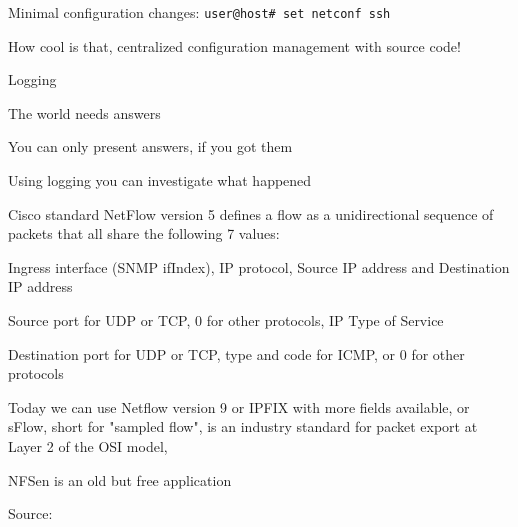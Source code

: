 \documentclass[Screen16to9,17pt]{foils}
\begin{document}
\begin{list2}
\item Minimal configuration changes: \verb+user@host# set netconf ssh+
\end{list2}

How cool is that, centralized configuration management with source code!



\centerline{\LARGE Logging}

\begin{quote}

\end{quote}

\begin{list2}
\item The world needs answers
\item You can only present answers, if you got them

\item Using logging you can investigate what happened
\end{list2}





\begin{slidelist}
\item Cisco standard NetFlow version 5 defines a flow as a unidirectional sequence of packets that all share the following 7 values:
\begin{list2}
\item Ingress interface (SNMP ifIndex), IP protocol, Source IP address and Destination IP address
\item Source port for UDP or TCP, 0 for other protocols, IP Type of Service
\item Destination port for UDP or TCP, type and code for ICMP, or 0 for other protocols
\end{list2}
\item Today we can use Netflow version 9 or IPFIX with more fields available, or  sFlow, short for "sampled flow", is an industry standard for packet export at Layer 2 of the OSI model, \\
\item NFSen is an old but free application
\end{slidelist}

Source: \\{\footnotesize
{}\\
}
\end{document}
